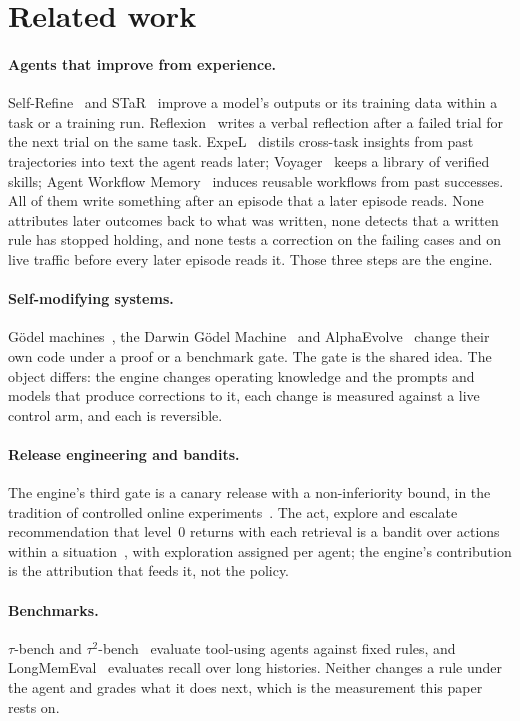 \documentclass[11pt]{article}
\begin{document}
\section{Related work}
\label{sec:related}

\paragraph{Agents that improve from experience.} Self-Refine~\cite{selfrefine} and
STaR~\cite{star} improve a model's outputs or its training data within a task or a training run.
Reflexion~\cite{reflexion} writes a verbal reflection after a failed trial for the next trial on
the same task. ExpeL~\cite{expel} distils cross-task insights from past trajectories into text
the agent reads later; Voyager~\cite{voyager} keeps a library of verified skills; Agent Workflow
Memory~\cite{awm} induces reusable workflows from past successes. All of them write something
after an episode that a later episode reads. None attributes later outcomes back to what was
written, none detects that a written rule has stopped holding, and none tests a correction on the
failing cases and on live traffic before every later episode reads it. Those three steps are the
engine.

\paragraph{Self-modifying systems.} Gödel machines~\cite{godel}, the Darwin Gödel
Machine~\cite{dgm} and AlphaEvolve~\cite{alphaevolve} change their own code under a proof or a
benchmark gate. The gate is the shared idea. The object differs: the engine changes operating
knowledge and the prompts and models that produce corrections to it, each change is measured
against a live control arm, and each is reversible.

\paragraph{Release engineering and bandits.} The engine's third gate is a canary release with a
non-inferiority bound, in the tradition of controlled online experiments~\cite{kohavi}. The act, explore and
escalate recommendation that level~0 returns with each retrieval is a bandit over actions within
a situation~\cite{bandits}, with exploration assigned per agent; the engine's contribution is
the attribution that feeds it, not the policy.

\paragraph{Benchmarks.} $\tau$-bench and $\tau^2$-bench~\cite{taubench,tau2bench} evaluate
tool-using agents against fixed rules, and LongMemEval~\cite{longmemeval} evaluates recall over
long histories. Neither changes a rule under the agent and grades what it does next, which is
the measurement this paper rests on.
\end{document}
